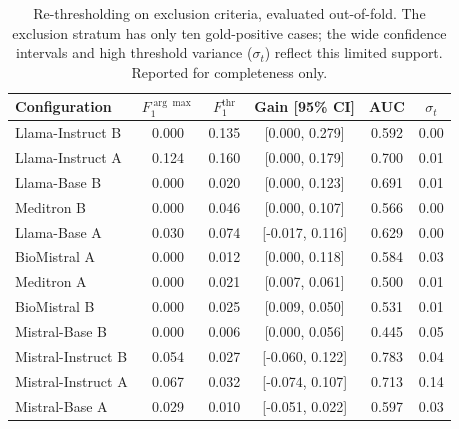 \begin{table}[htbp]
    \centering
    \caption{Re-thresholding on exclusion criteria, evaluated 
        out-of-fold. The exclusion stratum has only ten gold-positive 
        cases; the wide confidence intervals and high threshold variance 
        ($\sigma_t$) reflect this limited support. Reported for 
        completeness only.}
    \label{tab:app-rethreshold-excl}
    \small
    \begin{tabular}{@{}lccccc@{}}
        \toprule
        \textbf{Configuration} & 
        \boldmath$F_1^{\arg\max}$ & 
        \boldmath$F_1^{\text{thr}}$ & 
        \textbf{Gain [95\% CI]} & 
        \textbf{AUC} & 
        \boldmath$\sigma_t$ \\
        \midrule
        Llama-Instruct B   & 0.000 & 0.135 & [0.000, 0.279] & 0.592 & 0.00 \\
        Llama-Instruct A   & 0.124 & 0.160 & [0.000, 0.179] & 0.700 & 0.01 \\
        Llama-Base B       & 0.000 & 0.020 & [0.000, 0.123] & 0.691 & 0.01 \\
        Meditron B         & 0.000 & 0.046 & [0.000, 0.107] & 0.566 & 0.00 \\
        Llama-Base A       & 0.030 & 0.074 & [-0.017, 0.116] & 0.629 & 0.00 \\
        BioMistral A       & 0.000 & 0.012 & [0.000, 0.118] & 0.584 & 0.03 \\
        Meditron A         & 0.000 & 0.021 & [0.007, 0.061] & 0.500 & 0.01 \\
        BioMistral B       & 0.000 & 0.025 & [0.009, 0.050] & 0.531 & 0.01 \\
        Mistral-Base B     & 0.000 & 0.006 & [0.000, 0.056] & 0.445 & 0.05 \\
        Mistral-Instruct B & 0.054 & 0.027 & [-0.060, 0.122] & 0.783 & 0.04 \\
        Mistral-Instruct A & 0.067 & 0.032 & [-0.074, 0.107] & 0.713 & 0.14 \\
        Mistral-Base A     & 0.029 & 0.010 & [-0.051, 0.022] & 0.597 & 0.03 \\
        \bottomrule
    \end{tabular}
\end{table}